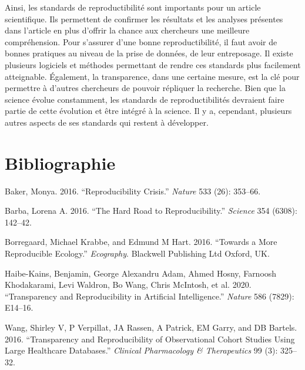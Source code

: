 \documentclass[
]{article}
\newlength{\cslhangindent}
\newlength{\cslentryspacingunit} %
\newenvironment{CSLReferences}[2] %
 {%
  \setlength{\parindent}{0pt}
  \ifodd #1
  \let\oldpar\par
  \def\par{\hangindent=\cslhangindent\oldpar}
  \fi
  \setlength{\parskip}{#2\cslentryspacingunit}
 }%
 {}
\begin{document}
Ainsi, les standards de reproductibilité sont importants pour un article
scientifique. Ils permettent de confirmer les résultats et les analyses
présentes dans l'article en plus d'offrir la chance aux chercheurs une
meilleure compréhension. Pour s'assurer d'une bonne reproductibilité, il
faut avoir de bonnes pratiques au niveau de la prise de données, de leur
entreposage. Il existe plusieurs logiciels et méthodes permettant de
rendre ces standards plus facilement atteignable. Également, la
transparence, dans une certaine mesure, est la clé pour permettre à
d'autres chercheurs de pouvoir répliquer la recherche. Bien que la
science évolue constamment, les standards de reproductibilités devraient
faire partie de cette évolution et être intégré à la science. Il y a,
cependant, plusieurs autres aspects de ses standards qui restent à
développer.

\newpage

\hypertarget{bibliographie}{%
\section*{Bibliographie}\label{bibliographie}}

\hypertarget{refs}{}
\begin{CSLReferences}{1}{0}
\leavevmode{}%
Baker, Monya. 2016. {``Reproducibility Crisis.''} \emph{Nature} 533
(26): 353--66.

\leavevmode{}%
Barba, Lorena A. 2016. {``The Hard Road to Reproducibility.''}
\emph{Science} 354 (6308): 142--42.

\leavevmode{}%
Borregaard, Michael Krabbe, and Edmund M Hart. 2016. {``Towards a More
Reproducible Ecology.''} \emph{Ecography}. Blackwell Publishing Ltd
Oxford, UK.

\leavevmode{}%
Haibe-Kains, Benjamin, George Alexandru Adam, Ahmed Hosny, Farnoosh
Khodakarami, Levi Waldron, Bo Wang, Chris McIntosh, et al. 2020.
{``Transparency and Reproducibility in Artificial Intelligence.''}
\emph{Nature} 586 (7829): E14--16.

\leavevmode{}%
Wang, Shirley V, P Verpillat, JA Rassen, A Patrick, EM Garry, and DB
Bartels. 2016. {``Transparency and Reproducibility of Observational
Cohort Studies Using Large Healthcare Databases.''} \emph{Clinical
Pharmacology \& Therapeutics} 99 (3): 325--32.

\end{CSLReferences}
\end{document}
